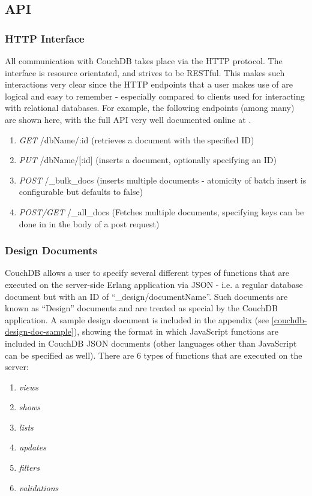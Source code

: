 \subsection{API}
\subsubsection{HTTP Interface}
All communication with CouchDB takes place via the HTTP protocol. The interface is resource orientated, and strives to be RESTful. This makes such interactions very clear since the HTTP endpoints that a user makes use of are logical and easy to remember - especially compared to clients used for interacting with relational databases. For example, the following endpoints (among many) are shown here, with the full API very well documented online at \cite{couch-api}.

\begin{enumerate}
    \item \textit{GET} /dbName/:id (retrieves a document with the specified ID)
    \item \textit{PUT} /dbName/[:id] (inserts a document, optionally specifying an ID)
    \item \textit{POST} /\_bulk\_docs (inserts multiple documents - atomicity of batch insert is configurable but defaults to false)
    \item \textit{POST/GET} /\_all\_docs (Fetches multiple documents, specifying keys can be done in in the body of a post request)
\end{enumerate}

\subsubsection{Design Documents}
CouchDB allows a user to specify several different types of functions that are executed on the server-side Erlang application via JSON - i.e. a regular database document but with an ID of ``\_design/documentName''. Such documents are known as ``Design'' documents and are treated as special by the CouchDB application. A sample design document is included in the appendix (see \ref{couchdb-design-doc-sample}), showing the format in which JavaScript functions are included in CouchDB JSON documents (other languages other than JavaScript can be specified as well). There are 6 types of functions that are executed on the server:

\begin{enumerate}
    \item \textit{views}
    \item \textit{shows}
    \item \textit{lists}
    \item \textit{updates}
    \item \textit{filters}
    \item \textit{validations}
\end{enumerate}

